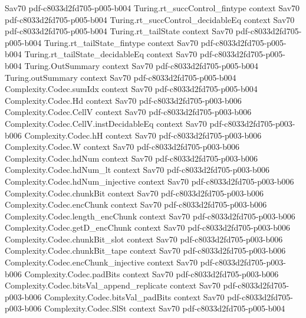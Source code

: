 \begin{theorem}
  {Sav70}
  {pdf-c8033d2fd705-p005-b004}
\proofstep
  {Turing.rt_succControl_fintype}
  {context}
  {Sav70}
  {pdf-c8033d2fd705-p005-b004}
\proofstep
  {Turing.rt_succControl_decidableEq}
  {context}
  {Sav70}
  {pdf-c8033d2fd705-p005-b004}
\proofstep
  {Turing.rt_tailState}
  {context}
  {Sav70}
  {pdf-c8033d2fd705-p005-b004}
\proofstep
  {Turing.rt_tailState_fintype}
  {context}
  {Sav70}
  {pdf-c8033d2fd705-p005-b004}
\proofstep
  {Turing.rt_tailState_decidableEq}
  {context}
  {Sav70}
  {pdf-c8033d2fd705-p005-b004}
\proofstep
  {Turing.OutSummary}
  {context}
  {Sav70}
  {pdf-c8033d2fd705-p005-b004}
\proofstep
  {Turing.outSummary}
  {context}
  {Sav70}
  {pdf-c8033d2fd705-p005-b004}
\proofstep
  {Complexity.Codec.sumIdx}
  {context}
  {Sav70}
  {pdf-c8033d2fd705-p005-b004}
\proofstep
  {Complexity.Codec.Hd}
  {context}
  {Sav70}
  {pdf-c8033d2fd705-p003-b006}
\proofstep
  {Complexity.Codec.CellV}
  {context}
  {Sav70}
  {pdf-c8033d2fd705-p003-b006}
\proofstep
  {Complexity.Codec.CellV.instDecidableEq}
  {context}
  {Sav70}
  {pdf-c8033d2fd705-p003-b006}
\proofstep
  {Complexity.Codec.hH}
  {context}
  {Sav70}
  {pdf-c8033d2fd705-p003-b006}
\proofstep
  {Complexity.Codec.W}
  {context}
  {Sav70}
  {pdf-c8033d2fd705-p003-b006}
\proofstep
  {Complexity.Codec.hdNum}
  {context}
  {Sav70}
  {pdf-c8033d2fd705-p003-b006}
\proofstep
  {Complexity.Codec.hdNum_lt}
  {context}
  {Sav70}
  {pdf-c8033d2fd705-p003-b006}
\proofstep
  {Complexity.Codec.hdNum_injective}
  {context}
  {Sav70}
  {pdf-c8033d2fd705-p003-b006}
\proofstep
  {Complexity.Codec.chunkBit}
  {context}
  {Sav70}
  {pdf-c8033d2fd705-p003-b006}
\proofstep
  {Complexity.Codec.encChunk}
  {context}
  {Sav70}
  {pdf-c8033d2fd705-p003-b006}
\proofstep
  {Complexity.Codec.length_encChunk}
  {context}
  {Sav70}
  {pdf-c8033d2fd705-p003-b006}
\proofstep
  {Complexity.Codec.getD_encChunk}
  {context}
  {Sav70}
  {pdf-c8033d2fd705-p003-b006}
\proofstep
  {Complexity.Codec.chunkBit_slot}
  {context}
  {Sav70}
  {pdf-c8033d2fd705-p003-b006}
\proofstep
  {Complexity.Codec.chunkBit_tape}
  {context}
  {Sav70}
  {pdf-c8033d2fd705-p003-b006}
\proofstep
  {Complexity.Codec.encChunk_injective}
  {context}
  {Sav70}
  {pdf-c8033d2fd705-p003-b006}
\proofstep
  {Complexity.Codec.padBits}
  {context}
  {Sav70}
  {pdf-c8033d2fd705-p003-b006}
\proofstep
  {Complexity.Codec.bitsVal_append_replicate}
  {context}
  {Sav70}
  {pdf-c8033d2fd705-p003-b006}
\proofstep
  {Complexity.Codec.bitsVal_padBits}
  {context}
  {Sav70}
  {pdf-c8033d2fd705-p003-b006}
\proofstep
  {Complexity.Codec.SlSt}
  {context}
  {Sav70}
  {pdf-c8033d2fd705-p005-b004}

\end{theorem}
